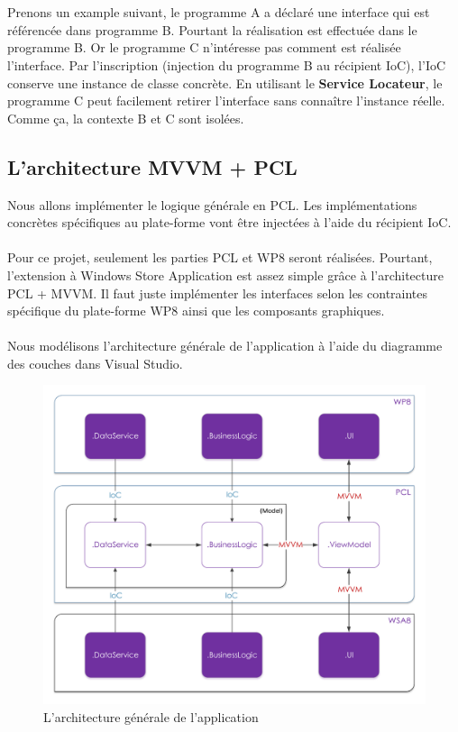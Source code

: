 \documentclass{article}
\begin{document}
\ \\\\
Prenons un example suivant, le programme A a déclaré une interface qui est référencée dans programme B. Pourtant la réalisation est effectuée dans le programme B. Or le programme C n'intéresse pas comment est réalisée l'interface. Par l'inscription (injection du programme B au récipient IoC), l'IoC conserve une instance de classe concrète. En utilisant le \textbf{Service Locateur}, le programme C peut facilement retirer l'interface sans connaître l'instance réelle. Comme ça, la contexte B et C sont isolées.

\newpage
\subsection{\Large L'architecture MVVM + PCL}

Nous allons implémenter le logique générale en PCL. Les implémentations concrètes spécifiques au plate-forme vont être injectées à l'aide du récipient IoC. 
\\\\
Pour ce projet, seulement les parties PCL et WP8 seront réalisées. Pourtant, l'extension à Windows Store Application est assez simple grâce à l'architecture PCL + MVVM. Il faut juste implémenter les interfaces selon les contraintes spécifique du plate-forme WP8 ainsi que les composants graphiques.
\\\\
Nous modélisons l'architecture générale de l'application à l'aide du diagramme des couches dans Visual Studio.

\begin{figure}[h!]
\centering
\includegraphics[width=150mm]{ARCHI.pdf}
\caption{L'architecture générale de l'application}
\end{figure}
\end{document}
